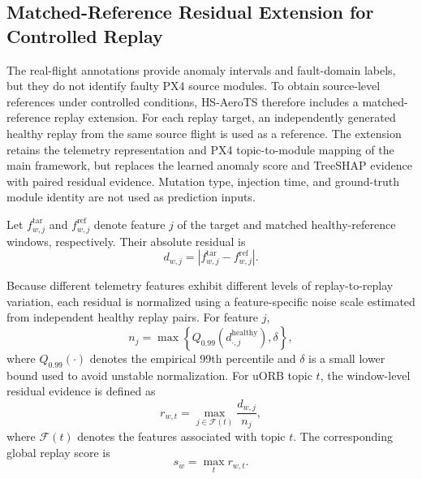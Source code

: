 \subsection{Matched-Reference Residual Extension for Controlled Replay}
\label{sec:paired_replay_method}

The real-flight annotations provide anomaly intervals and fault-domain labels, but they do not identify faulty PX4 source modules. To obtain source-level references under controlled conditions, HS-AeroTS therefore includes a matched-reference replay extension. For each replay target, an independently generated healthy replay from the same source flight is used as a reference. The extension retains the telemetry representation and PX4 topic-to-module mapping of the main framework, but replaces the learned anomaly score and TreeSHAP evidence with paired residual evidence. Mutation type, injection time, and ground-truth module identity are not used as prediction inputs.

Let $f^{\mathrm{tar}}_{w,j}$ and $f^{\mathrm{ref}}_{w,j}$ denote feature $j$ of the target and matched healthy-reference windows, respectively. Their absolute residual is
\begin{equation}
d_{w,j}
=
\left|
f^{\mathrm{tar}}_{w,j}
-
f^{\mathrm{ref}}_{w,j}
\right|.
\label{eq:paired_residual}
\end{equation}

Because different telemetry features exhibit different levels of replay-to-replay variation, each residual is normalized using a feature-specific noise scale estimated from independent healthy replay pairs. For feature $j$,
\begin{equation}
n_j
=
\max
\left\{
Q_{0.99}\left(d^{\mathrm{healthy}}_{\cdot,j}\right),
\delta
\right\},
\label{eq:replay_noise_scale}
\end{equation}
where $Q_{0.99}(\cdot)$ denotes the empirical 99th percentile and $\delta$ is a small lower bound used to avoid unstable normalization. For uORB topic $t$, the window-level residual evidence is defined as
\begin{equation}
r_{w,t}
=
\max_{j\in\mathcal{F}(t)}
\frac{d_{w,j}}{n_j},
\label{eq:topic_residual_evidence}
\end{equation}
where $\mathcal{F}(t)$ denotes the features associated with topic $t$. The corresponding global replay score is
\begin{equation}
s_w
=
\max_{t} r_{w,t}.
\label{eq:global_replay_score}
\end{equation}

